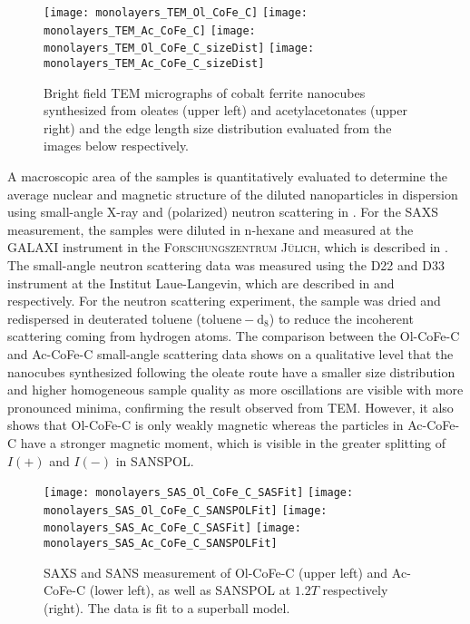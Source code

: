 \documentclass[\main/dresen_thesis.tex]{subfiles}
\begin{document}
    \begin{figure}[tb]
      \centering
      \hspace{0.3 cm}
      \texttt{[image: monolayers\_TEM\_Ol\_CoFe\_C]}
      \hspace{0.3 cm}
      \texttt{[image: monolayers\_TEM\_Ac\_CoFe\_C]}
      \texttt{[image: monolayers\_TEM\_Ol\_CoFe\_C\_sizeDist]}
      \texttt{[image: monolayers\_TEM\_Ac\_CoFe\_C\_sizeDist]}
      \caption{\label{fig:monolayers:nanoparticle:tem}Bright field TEM micrographs of cobalt ferrite nanocubes synthesized from oleates (upper left) and acetylacetonates (upper right) and the edge length size distribution evaluated from the images below respectively.}
    \end{figure}

    A macroscopic area of the samples is quantitatively evaluated to determine the average nuclear and magnetic structure of the diluted nanoparticles in dispersion using small-angle X-ray and (polarized) neutron scattering in .
    For the SAXS measurement, the samples were diluted in n-hexane and measured at the GALAXI instrument in the \textsc{Forschungszentrum J\"ulich}, which is described in .
    The small-angle neutron scattering data was measured using the D22 and D33 instrument at the Institut Laue-Langevin, which are described in  and  respectively.
    For the neutron scattering experiment, the sample was dried and redispersed in deuterated toluene ($\mathrm{toluene-d_8}$) to reduce the incoherent scattering coming from hydrogen atoms.
    The comparison between the Ol-CoFe-C and Ac-CoFe-C small-angle scattering data shows on a qualitative level that the nanocubes synthesized following the oleate route have a smaller size distribution and higher homogeneous sample quality as more oscillations are visible with more pronounced minima, confirming the result observed from TEM.
    However, it also shows that Ol-CoFe-C is only weakly magnetic whereas the particles in Ac-CoFe-C have a stronger magnetic moment, which is visible in the greater splitting of $I(+)$ and $I(-)$ in SANSPOL.

    \begin{figure}[tb]
      \centering
      \texttt{[image: monolayers\_SAS\_Ol\_CoFe\_C\_SASFit]}
      \texttt{[image: monolayers\_SAS\_Ol\_CoFe\_C\_SANSPOLFit]}
      \texttt{[image: monolayers\_SAS\_Ac\_CoFe\_C\_SASFit]}
      \texttt{[image: monolayers\_SAS\_Ac\_CoFe\_C\_SANSPOLFit]}
      \caption{\label{fig:monolayers:nanoparticle:sas:AcOlCoFeC}SAXS and SANS measurement of Ol-CoFe-C (upper left) and Ac-CoFe-C (lower left), as well as SANSPOL at $1.2 \unit{T}$ respectively (right). The data is fit to a superball model.}
    \end{figure}
\end{document}
